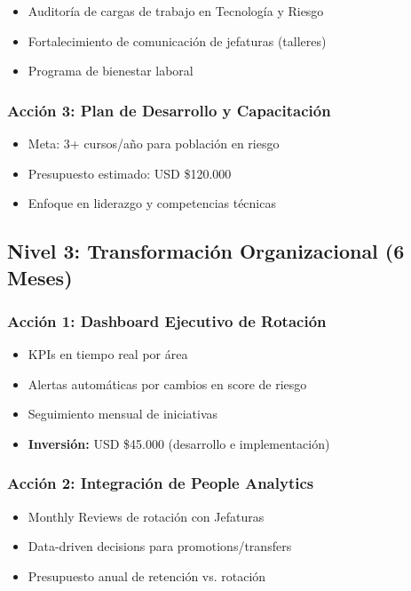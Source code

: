\documentclass[11pt,a4paper,twoside]{article}
\begin{document}
\begin{itemize}
    \item Auditoría de cargas de trabajo en Tecnología y Riesgo
    \item Fortalecimiento de comunicación de jefaturas (talleres)
    \item Programa de bienestar laboral
\end{itemize}

\subsubsection{Acción 3: Plan de Desarrollo y Capacitación}

\begin{itemize}
    \item Meta: 3+ cursos/año para población en riesgo
    \item Presupuesto estimado: USD \$120.000
    \item Enfoque en liderazgo y competencias técnicas
\end{itemize}

\subsection{Nivel 3: Transformación Organizacional (6 Meses)}

\subsubsection{Acción 1: Dashboard Ejecutivo de Rotación}

\begin{itemize}
    \item KPIs en tiempo real por área
    \item Alertas automáticas por cambios en score de riesgo
    \item Seguimiento mensual de iniciativas
    \item \textbf{Inversión:} USD \$45.000 (desarrollo e implementación)
\end{itemize}

\subsubsection{Acción 2: Integración de People Analytics}

\begin{itemize}
    \item Monthly Reviews de rotación con Jefaturas
    \item Data-driven decisions para promotions/transfers
    \item Presupuesto anual de retención vs. rotación
\end{itemize}
\end{document}
